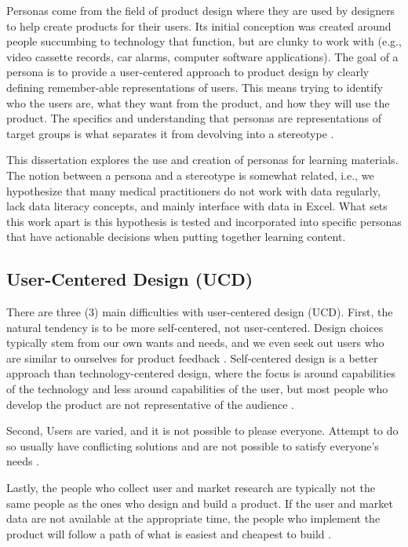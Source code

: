 \documentclass[010-intro.tex]{subfiles}
\begin{document}
Personas come from the field of product design
where they are used by designers to help create products for their users.
Its initial conception was created around people succumbing to technology that
function, but are clunky to work with
(e.g., video cassette records, car alarms, computer software applications).
The goal of a persona is to provide a user-centered approach to product design
by clearly defining remember-able representations of users.
This means trying to identify who the users are,
what they want from the product, and
how they will use the product.
The specifics and understanding that personas are representations of target groups
is what separates it from devolving into a stereotype
\cite{pruittPersonaLifecycleKeeping2006}.

This dissertation explores the use and creation of personas for learning materials.
The notion between a persona and a stereotype is somewhat related,
i.e., we hypothesize that many medical practitioners do not work with data regularly,
lack data literacy concepts, and mainly interface with data in Excel.
What sets this work apart is this hypothesis is tested and incorporated into specific
personas that have actionable decisions when putting together learning content.

\subsection{User-Centered Design (UCD)}

    There are three (3) main difficulties with user-centered design (UCD).
    First,
    the natural tendency is to be more self-centered, not user-centered.
        Design choices typically stem from our own wants and needs,
        and we even seek out users who are similar to ourselves for product feedback
        \cite{pruittPersonaLifecycleKeeping2006, tognazziniTogSoftwareDesign1748}.
        Self-centered design is a better approach than technology-centered design,
        where the focus is around capabilities of the technology and less around capabilities of the user,
        but most people who develop the product are not representative of the audience
        \cite{pruittPersonaLifecycleKeeping2006}.

    Second,
    Users are varied, and it is not possible to please everyone.
    Attempt to do so usually have conflicting solutions and are not possible to satisfy everyone's needs
    \cite{pruittPersonaLifecycleKeeping2006}.

    Lastly,
    the people who collect user and market research are typically not the same people as the ones who
    design and build a product.
    If the user and market data are not available at the appropriate time,
    the people who implement the product will follow a path of what is easiest and cheapest to build
    \cite{pruittPersonaLifecycleKeeping2006}.
\end{document}
